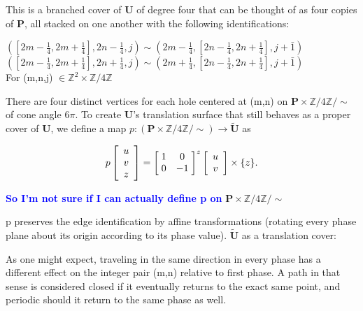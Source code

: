 \documentclass[]{article}
\newcommand{\compav}[1]{\textbf{\textcolor{blue}{#1}}}
\begin{document}
\begin{center}

\end{center}
This is a branched cover of $\mathbf{U}$ of degree four that can be thought of as four copies of $\mathbf{P}$, all stacked on one another with the following identifications:
\begin{center}
$([2m-\frac{1}{4}, 2m+\frac{1}{4}], 2n-\frac{1}{4},j)\sim(2m-\frac{1}{4},[2n-\frac{1}{4}, 2n+\frac{1}{4}],j+\bar{1})$\\
\vspace{0.2in}$([2m-\frac{1}{4}, 2m+\frac{1}{4}], 2n+\frac{1}{4},j)\sim(2m+\frac{1}{4},[2n-\frac{1}{4}, 2n+\frac{1}{4}],j+\bar{1})$\\
\vspace{0.2in}For (m,n,j) $\in \mathbb{Z}^{2}\times\mathbb{Z}/4\mathbb{Z}$
\end{center}
There are four distinct vertices for each hole centered at (m,n) on  $\mathbf{P}\times\mathbb{Z}/4\mathbb{Z}/\sim$ of cone angle $6\pi$. To create  $\mathbf{U}$'s translation surface that still behaves as a proper cover of $\mathbf{U}$, we define a map  $p:(\mathbf{P}\times\mathbb{Z}/4\mathbb{Z}/\sim) \rightarrow \tilde{\mathbf{U}}$ as

\begin{equation}
	p\left[\begin{array}{c}
		u\\v\\z
	\end{array}\right] =
		\left[ \hspace{1mm} \begin{matrix}
				1 & 0 \\
				0 & -1 \\
			\end{matrix}\hspace{1mm}\right]^{z}\left[\begin{array}{c}
					u\\v
				\end{array}\right]\times\{z\}.
\end{equation}

\compav{So I'm not sure if I can actually define p on}
 $\mathbf{P}\times\mathbb{Z}/4\mathbb{Z}/\sim$

p preserves the edge identification by affine transformations (rotating every phase plane about its origin according to its phase value).  $\tilde{\mathbf{U}}$ as a translation cover:

\begin{figure}[H]
\centering

\end{figure}
As one might expect, traveling in the same direction in every phase has a different effect on the integer pair (m,n) relative to first phase. A path in that sense is considered closed if it eventually returns to the exact same point, and periodic should it return to the same phase as well.
\end{document}
